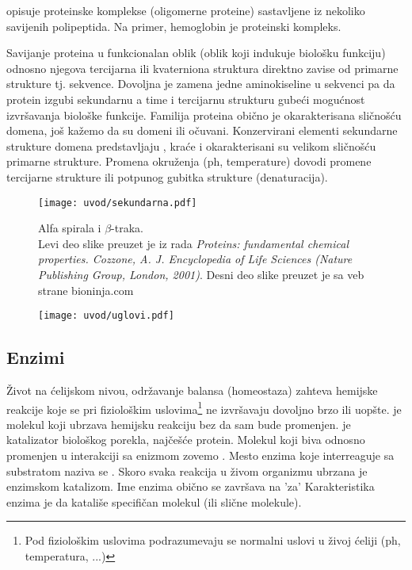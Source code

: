  opisuje proteinske komplekse (oligomerne proteine) sastavljene
iz nekoliko savijenih polipeptida. Na primer, hemoglobin je proteinski kompleks.

Savijanje proteina u funkcionalan oblik (oblik koji indukuje biološku funkciju)
odnosno njegova tercijarna ili kvaterniona struktura direktno zavise od
primarne strukture tj. sekvence. Dovoljna je zamena jedne aminokiseline u sekvenci
pa da protein izgubi sekundarnu a time i tercijarnu strukturu gubeći mogućnost
izvršavanja biološke funkcije. Familija proteina obično je okarakterisana
sličnošću domena, još kažemo da su domeni  ili očuvani.
Konzervirani elementi sekundarne strukture domena predstavljaju
, kraće  i okarakterisani su velikom
sličnošću primarne strukture. Promena okruženja (ph, temperature) dovodi promene
tercijarne strukture ili potpunog gubitka strukture (denaturacija).

\begin{figure}[th]
\centering
\hspace*{-2.0cm} 
\texttt{[image: uvod/sekundarna.pdf]}
\caption {
  Alfa spirala i $\beta$-traka.\\ \footnotesize Levi deo slike preuzet je iz rada
  \textit{Proteins: fundamental chemical properties. Cozzone, A. J.
  Encyclopedia of Life Sciences (Nature Publishing Group, London, 2001)}.
  Desni deo slike preuzet je sa veb strane bioninja.com
}
\label{fig:sekundarna}
\end{figure}

\begin{figure}[th]
\centering
\texttt{[image: uvod/uglovi.pdf]}
\caption { }
\label{fig:uglovi}
\end{figure}



\subsection{Enzimi}

Život na ćelijskom nivou, održavanje balansa (homeostaza) zahteva hemijske
reakcije koje se pri fiziološkim uslovima\footnote{Pod fiziološkim uslovima
podrazumevaju se normalni uslovi u živoj ćeliji (ph, temperatura, ...)} ne
izvršavaju dovoljno brzo ili uopšte.
 je molekul koji ubrzava hemijsku reakciju bez da sam bude
promenjen.  je katalizator biološkog porekla, najčešće protein.
Molekul koji biva  odnosno promenjen u interakciji sa
enizmom zovemo . Mesto enzima koje interreaguje sa
substratom naziva se .  Skoro svaka reakcija u živom
organizmu ubrzana je enzimskom katalizom. Ime enzima obično se završava na 'za'
Karakteristika enzima je da katališe specifičan molekul (ili slične molekule).


